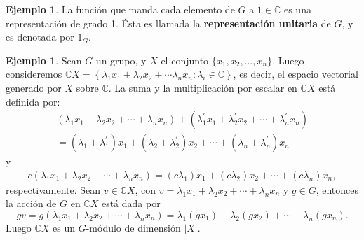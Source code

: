 \documentclass[12pt]{book}
\theoremstyle{definition}
\newtheorem{example}[theorem]{Ejemplo}
\newcounter{in}
\newcounter{ini}
\begin{document}
\begin{example}
  \label{Ej6}
  La función que manda cada elemento de $G$ a $1
  \in \mathbb{C}$ es una representación de grado 1. Ésta es llamada la
  \textbf{representación unitaria} de $G$, y es denotada por $1_{G}$. 
\end{example}
\begin{example}
\label{ex_mod_per}
Sean $G$ un grupo, y $X$ el conjunto
$\{x_{1},x_{2},\ldots,x_{n}\}$. Luego consideremos
$\mathbb{C} X = \left \{ \lambda_1 x_{1} +\lambda_2 x_{2} + \cdots
  \lambda_n x_{n} : \lambda_{i} \in \mathbb{C} \right \}$, es decir,
el espacio vectorial generado por $X$ sobre $\mathbb{C}$.  La suma y
la multiplicación por escalar en $\mathbb{C} X$ está definida por:
  \begin{eqnarray*}
    (\lambda_{1}x_{1}+\lambda_{2}x_{2}+\cdots
    +\lambda_{n}x_{n})+(\lambda^{'}_{1}x_{1}+\lambda^{'}_{2}x_{2}+\cdots +\lambda^{'}_{n}x_{n})\\
    =(\lambda_{1}+\lambda^{'}_{1})x_{1}+(\lambda_{2}+\lambda^{'}_{2})x_{2}+\cdots
    +(\lambda_{n}+\lambda^{'}_{n})x_{n}
  \end{eqnarray*}
  y
  \begin{eqnarray*}
    c(\lambda_{1}x_{1}+\lambda_{2}x_{2}+\cdots +\lambda_{n}x_{n})=(c\lambda_{1})x_{1}+(c\lambda_{2})x_{2}+\cdots +(c\lambda_{n})x_{n},
  \end{eqnarray*}
  respectivamente. Sean $v\in \mathbb{C}X$, con
  $v=\lambda_{1}x_{1}+\lambda_{2}x_{2}+\cdots+\lambda_{n}x_{n}$ y $g\in G$, entonces la acción de $G$ en $\mathbb{C}X$ está dada por
  \begin{equation*}
    gv=g(\lambda_{1}x_{1}+\lambda_{2}x_{2}+\cdots +\lambda_{n}x_{n})=\lambda_{1}(gx_{1})+\lambda_{2}(gx_{2})+\cdots +\lambda_{n}(gx_{n}).
\end{equation*}
Luego $\mathbb{C}X$ es un $G$-módulo de dimensión $|X|$. 


\end{example}
\end{document}
